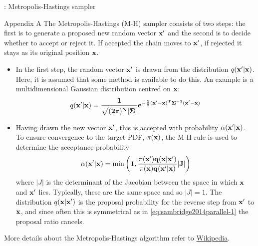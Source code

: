 

\begin{frame}[c]{\titleprefix: Metropolis-Hastings sampler}

  \tiny
  \begin{block}{Appendix A}
    The Metropolis-Hastings (M-H) sampler consists of two steps:
    the first is to generate a proposed new random vector $\bf x'$
    and the second is to decide whether to accept or reject it.
    If accepted the chain moves to $\bf x'$,
    if rejected it stays as its original position $\bf x$.

    \begin{itemize}
      \tiny
      \item In the first step, the random vector $\bf x'$ is drawn from
      the distribution $q(\bf x' | \bf x)$.
      Here, it is assumed that some method is available to do this.
      An example is a multidimensional Gaussian distribution centred on $\bf x$:
      \begin{equation}\label{eq:sambridge2014parallel-1}
        q(\bf x' | \bf x) = \frac{1}{ \sqrt{(2\pi)^N | \Sigma |} }
          e^{ - \frac{1}{2} (\bf x' - \bf x)^T \Sigma^{-1} (\bf x' - \bf x) }
      \end{equation}

      \item Having drawn the new vector $\bf x'$,
      this is accepted with probability $\alpha(\bf x' | \bf x)$.
      To ensure convergence to the target PDF, $\pi(\bf x)$,
      the M-H rule is used to determine the acceptance probability
      \[ \alpha(\bf x' | \bf x) = \min\left( 1,
        \frac{ \pi(\bf x') q(\bf x | \bf x') }{ \pi(\bf x) q(\bf x' | \bf x) }
        |J| \right) \]
      where $|J|$ is the determinant of the Jacobian
      between the space in which $\bf x$ and $\bf x'$ lies.
      Typically, these are the same space and so $|J| = 1$.
      The distribution $q(\bf x | \bf x')$ is the proposal probability
      for the reverse step from $\bf x'$ to $\bf x$,
      and since often this is symmetrical as in
      \eqref{eq:sambridge2014parallel-1} the proposal ratio cancels.
    \end{itemize}

  \end{block}

  More details about the Metropolis-Hastings algorithm refer to
  \href{https://en.wikipedia.org/wiki/%
  Metropolis-Hastings_algorithm\#Formal_derivation}{Wikipedia}.

\end{frame}
